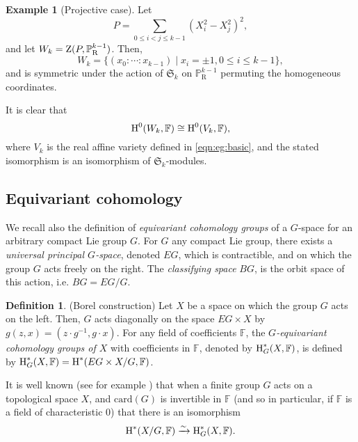 \documentclass{amsart}
\theoremstyle{definition}
\newtheorem{definition}{Definition}
\newtheorem{example}{Example}
\theoremstyle{remark}
\numberwithin{equation}{section}
\begin{document}
\begin{example}[Projective case]
\label{eg:real-projective}
Let 
\[
P = \sum_{0\leq i< j \leq k-1} (X_i^2 - X_j^2)^2, 
\]
and let $W_k = {{\rm Z}}(P,{\mathbb{P}}_{\mathrm{R}}^{k-1})$.
Then,
\[
W_k = \{(x_0:\cdots:x_{k-1}) \mid x_i = \pm 1, 0 \leq i \leq k-1\},
\]
and is symmetric under the action of $\mathfrak{S}_{k}$ on ${\mathbb{P}}_{\mathrm{R}}^{k-1}$ permuting the homogeneous coordinates.

It is clear that 
\[
{\mbox{\rm H}}^0(W_k,{\mathbb{F}}) \cong{\mbox{\rm H}}^0(V_k,{\mathbb{F}}),
\]
where $V_k$ is the real affine variety defined in \eqref{eqn:eg:basic}, and the stated isomorphism is
an isomorphism of $\mathfrak{S}_k$-modules. 
\end{example}

\subsection{Equivariant cohomology}
We recall also the definition of \emph{equivariant cohomology groups} of a
$G$-space for an arbitrary compact Lie group $G$. For $G$ any compact Lie
group, there exists a \emph{universal principal $G$-space}, denoted $E G$,
which is contractible, and on which the group $G$ acts freely on the right. 
The \emph{classifying space} $B G$, is the orbit space of this action, i.e.
$B G= E G/G$.

\begin{definition}
  \label{def:equivariant-cohomology} (Borel construction) Let $X$ be a space
  on which the group $G$ acts on the left. Then, $G$ acts diagonally on the
  space $E G \times X$ by $g (z,x) = (z \cdot g^{-1} ,g \cdot x)$. For any
  field of coefficients ${\mathbb{F}}$, the \emph{$G$-equivariant cohomology
  groups of $X$} with coefficients in ${\mathbb{F}}$, denoted by
  ${\mbox{\rm H}}^{\ast}_{G} (X,{\mathbb{F}})$, is defined by
${\mbox{\rm H}}^{\ast}_{G} (X,{\mathbb{F}})  =  {\mbox{\rm H}}^{\ast} (E G \times X/G,{\mathbb{F}})$.
\end{definition}

It is well known (see for example {\cite{Quillen71}}) that when a 
finite  group $G$ acts on a topological space $X$, 
and
${\mathrm{card}}(G)$ is invertible in ${\mathbb{F}}$ (and so in particular, if ${\mathbb{F}}$ is a field of characteristic $0$)
that there is an isomorphism
\begin{equation}
\label{eqn:iso1}
{\mbox{\rm H}}^{\ast} (X/G,{\mathbb{F}}) \xrightarrow{\sim} {\mbox{\rm H}}_{G}^{\ast} (X,{\mathbb{F}}).
\end{equation}
\end{document}
